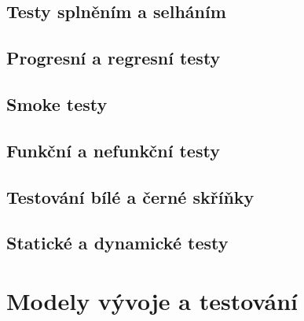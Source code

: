 \subsection{Testy splněním a selháním}
\subsection{Progresní a regresní testy}
\subsection{Smoke testy}
\subsection{Funkční a nefunkční testy}
\subsection{Testování bílé a černé skříňky}
\subsection{Statické a dynamické testy}

\section{Modely vývoje a testování}

\endinput
